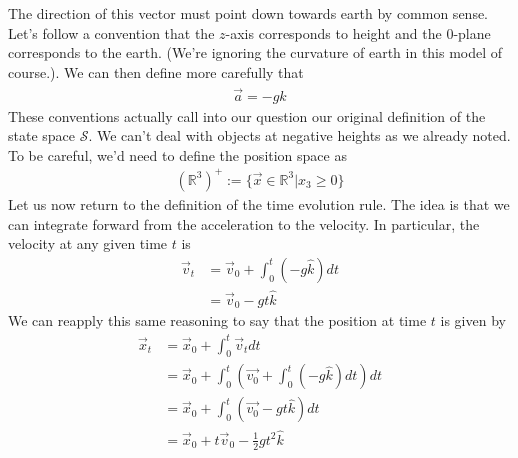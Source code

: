 \documentclass[book.tex]{subfiles}
\begin{document}
The direction of this vector must point down towards earth by common sense. Let's follow a convention that the $z$-axis corresponds to height and the $0$-plane corresponds to the earth. (We're ignoring the curvature of earth in this model of course.). We can then define more carefully that 
\begin{align}
\vec{a} = - g \hat{k}
\end{align}
These conventions actually call into our question our original definition of the state space $\mathcal{S}$. We can't deal with objects at negative heights as we already noted. To be careful, we'd need to define the position space as 
\begin{align}
    (\mathbb{R}^3)^+ := \{\vec{x} \in \mathbb{R}^3 | x_3 \geq 0 \}
\end{align}
Let us now return to the definition of the time evolution rule. The idea is that we can integrate forward from the acceleration to the velocity. In particular, the velocity at any given time $t$ is
\begin{align}
\vec{v}_t &= \vec{v}_0 + \int_{0}^t (-g \hat{k}) dt \\
&= \vec{v}_0 - g t \hat{k}
\end{align}
We can reapply this same reasoning to say that the position at time $t$ is given by
\begin{align}
    \vec{x}_t &= \vec{x}_0 + \int_{0}^t \vec{v}_t dt \\
    &= \vec{x}_0 + \int_{0}^t \left (\vec{v_0} + \int_{0}^t (- g \hat{k}) dt \right ) dt \\
    &= \vec{x}_0 + \int_{0}^t \left (\vec{v_0} - g t \hat{k} \right ) dt \\
    &= \vec{x}_0 + t \vec{v}_0 - \frac{1}{2}gt^2 \hat{k}
\end{align}
\end{document}

